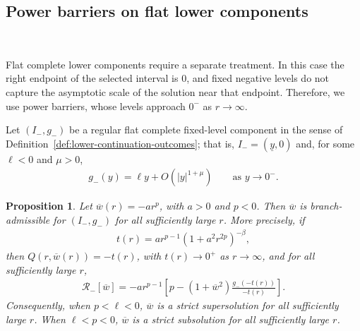\documentclass{amsart}
\theoremstyle{plain}
\newtheorem{proposition}[theorem]{Proposition}
\theoremstyle{mainintrothm}
\theoremstyle{definition}
\begin{document}
	
	\subsection{Power barriers on flat lower components}\,
	\label{subsec:power-barriers-flat-components}
	
	Flat complete lower components require a separate treatment.  In this case the
right endpoint
	of the selected interval is $0$, and fixed negative levels do not capture the
	asymptotic scale of the solution near that endpoint.  Therefore, we use power
	barriers, whose levels approach $0^-$ as $r\to\infty$.
	
	Let $(I_-,g_-)$ be a regular flat complete fixed-level component in the sense
	of Definition~\ref{def:lower-continuation-outcomes}; that is,
	$I_-=(\underline y,0)$ and, for some $\ell<0$ and $\mu>0$,
	\begin{align*}
		g_-(y)
		=
		\ell y+O(|y|^{1+\mu})
		\qquad
		\text{as }y\to0^-.
	\end{align*}
	
	\begin{proposition}
		\label{prop:power-barrier-flat-component}
		Let $\overline w(r)=-ar^p$, with $a>0$ and $p<0$.  Then
		$\overline w$ is branch-admissible for $(I_-,g_-)$ for all sufficiently
		large $r$.  More precisely, if
		\begin{align*}
			t(r)
			=
			ar^{p-1}(1+a^2r^{2p})^{-\beta},
		\end{align*}
		then $Q(r,\overline w(r))=-t(r)$, with $t(r)\to0^+$ as $r\to\infty$, and
		for all sufficiently large $r$,
		\begin{align}
			\label{eq:power-barrier-residual}
			\mathcal R_-[\overline w]
			=
			-ar^{p-1}
			\left[
			p
			-
			(1+\overline w^2)
			\frac{g_-(-t(r))}{-t(r)}
			\right].
		\end{align}
		Consequently, when $p<\ell<0$, $\overline w$ is a strict supersolution
		for all sufficiently large $r$.  When $\ell<p<0$, $\overline w$ is a
		strict subsolution for all sufficiently large $r$.
	\end{proposition}
	
\end{document}
